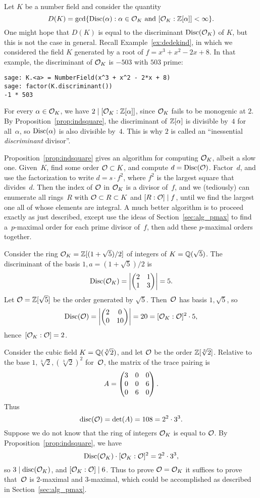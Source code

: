 \begin{example}\label{ex:exdim}
Let $K$ be a number field and consider the quantity
$$
  D(K) = \gcd\{\operatorname{Disc}(\alpha) : \alpha \in \mathcal{O}_K \text{ and } [\mathcal{O}_K:\mathbb{Z}{}[\alpha]] < \infty\}.
$$
One might hope that $D(K)$ is equal to the discriminant $\operatorname{Disc}(\mathcal{O}_K)$
of $K$, but this is not the case in general.  Recall
Example~\ref{ex:dedekind}, in which we considered the field $K$ generated
by a root of $f = x^3 + x^2 - 2x+8$.  In that example, the
discriminant of $\mathcal{O}_K$ is $-503$ with $503$ prime:
\begin{verbatim}
sage: K.<a> = NumberField(x^3 + x^2 - 2*x + 8)
sage: factor(K.discriminant())
-1 * 503
\end{verbatim}
For every $\alpha\in\mathcal{O}_K$, we have $2\mid [\mathcal{O}_K:\mathbb{Z}[\alpha]]$, since 
$\mathcal{O}_K$ fails to be monogenic at $2$.  By
Proposition~\ref{prop:indsquare}, the discriminant of $\mathbb{Z}[\alpha]$ is
divisible by~$4$ for all~$\alpha$, so $\operatorname{Disc}(\alpha)$ is also
divisible by~$4$.  This is why $2$ is called an ``inessential
{\em discriminant} divisor''.
\end{example}

Proposition~\ref{prop:indsquare} gives an algorithm for computing $\mathcal{O}_K$,
albeit a  slow one.  Given~$K$, find some order $\mathcal{O}\subset
K$, and compute $d=\operatorname{Disc}(\mathcal{O})$.  Factor~$d$, and use the factorization
to write $d=s\cdot f^2$, where $f^2$ is the largest square that
divides~$d$.  Then the index of $\mathcal{O}$ in $\mathcal{O}_K$ is a divisor of~$f$,
and we (tediously) can enumerate all rings~$R$ with $\mathcal{O}\subset
R\subset K$ and $[R:\mathcal{O}] \mid f$, until we find the largest one all of
whose elements are integral.  A much better algorithm is to proceed
exactly as just described, except use the ideas
of Section~\ref{sec:alg_pmax} to find a~$p$-maximal order for each prime
divisor of~$f$, then add these $p$-maximal orders together.

\begin{example}
Consider the ring $\mathcal{O}_K = \mathbb{Z}[(1+\sqrt{5})/2]$ of integers of 
$K=\mathbb{Q}(\sqrt{5})$.  The discriminant of the basis $1,a=(1+\sqrt{5})/2$
is
\[
  \operatorname{Disc}(\mathcal{O}_K) = \left| \left( \begin{matrix}2&1\\1&3 \end{matrix}\right) \right| = 5.
\]
Let $\mathcal{O}=\mathbb{Z}[\sqrt{5}]$ be the order generated by $\sqrt{5}$.
Then~$\mathcal{O}$ has basis $1,\sqrt{5}$, so 
\[
  \operatorname{Disc}(\mathcal{O}) = \left| \left( \begin{matrix}2&0\\0&10 \end{matrix}\right) \right| = 20 = [\mathcal{O}_K:\mathcal{O}]^2\cdot 5,
\]
hence~$[\mathcal{O}_K:\mathcal{O}] = 2$.
\end{example}

\begin{example}
Consider the cubic field $K=\mathbb{Q}(\sqrt[3]{2})$, and
let $\mathcal{O}$ be the order $\mathbb{Z}[\sqrt[3]{2}]$.  
Relative to the base $1,\sqrt[3]{2}, (\sqrt[3]{2})^2$ for~$\mathcal{O}$,
the matrix of the trace pairing is
$$
  A = \left( \begin{matrix}3&0&0\\0&0&6\\0&6&0 \end{matrix}\right).
$$
Thus 
$$
 \operatorname{disc}(\mathcal{O}) = \det(A)= 108 = 2^2\cdot 3^3.
$$
Suppose we do not know that the ring of integers
$\mathcal{O}_K$ is equal to $\mathcal{O}$.  By Proposition~\ref{prop:indsquare},
we  have
$$
\operatorname{Disc}(\mathcal{O}_K)\cdot [\mathcal{O}_K:\mathcal{O}]^2 = 2^2\cdot 3^3,
$$
so $3\mid \operatorname{disc}(\mathcal{O}_K)$, and $[\mathcal{O}_K:\mathcal{O}] \mid 6$.
Thus to prove $\mathcal{O}=\mathcal{O}_K$ it suffices to prove
that~$\mathcal{O}$ is $2$-maximal and $3$-maximal, 
which could be accomplished as described in 
Section~\ref{sec:alg_pmax}.
\end{example}

